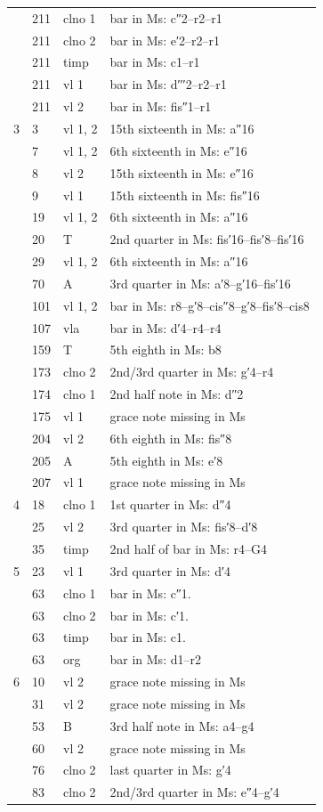 \documentclass[parskip=full]{scrreprt}
\begin{document}
\begin{longtable}{lll L{10cm}}
	  & 211 & clno 1  & bar in Ms: c″2–r2–r1 \\
	  & 211 & clno 2  & bar in Ms: e′2–r2–r1 \\
	  & 211 & timp    & bar in Ms: c1–r1 \\
	  & 211 & vl 1    & bar in Ms: d′′′2–r2–r1 \\
	  & 211 & vl 2    & bar in Ms: fis″1–r1 \\
	3 & 3   & vl 1, 2 & 15th sixteenth in Ms: a″16 \\
	  & 7   & vl 1, 2 & 6th sixteenth in Ms: e″16 \\
	  & 8   & vl 2    & 15th sixteenth in Ms: e″16 \\
	  & 9   & vl 1    & 15th sixteenth in Ms: fis″16 \\
	  & 19  & vl 1, 2 & 6th sixteenth in Ms: a″16 \\
	  & 20  & T       & 2nd quarter in Ms: fis′16–fis′8–fis′16 \\
	  & 29  & vl 1, 2 & 6th sixteenth in Ms: a″16 \\
	  & 70  & A       & 3rd quarter in Ms: a′8–g′16–fis′16 \\
	  & 101 & vl 1, 2 & bar in Ms: r8–g′8–cis″8–g′8–fis′8–cis8 \\
	  & 107 & vla     & bar in Ms: d′4–r4–r4 \\
	  & 159 & T       & 5th eighth in Ms: b8 \\
	  & 173 & clno 2  & 2nd/3rd quarter in Ms: g′4–r4 \\
	  & 174 & clno 1  & 2nd half note in Ms: d″2 \\
	  & 175 & vl 1    & grace note missing in Ms \\
	  & 204 & vl 2    & 6th eighth in Ms: fis″8 \\
	  & 205 & A       & 5th eighth in Ms: e′8 \\
	  & 207 & vl 1    & grace note missing in Ms \\
	4 & 18  & clno 1  & 1st quarter in Ms: d″4 \\
	  & 25  & vl 2    & 3rd quarter in Ms: fis′8–d′8 \\
	  & 35  & timp    & 2nd half of bar in Ms: r4–G4 \\
	5 & 23  & vl 1    & 3rd quarter in Ms: d′4 \\
	  & 63  & clno 1  & bar in Ms: c″1. \\
	  & 63  & clno 2  & bar in Ms: c′1. \\
	  & 63  & timp    & bar in Ms: c1. \\
	  & 63  & org     & bar in Ms: d1–r2 \\
	6 & 10  & vl 2    & grace note missing in Ms \\
	  & 31  & vl 2    & grace note missing in Ms \\
	  & 53  & B       & 3rd half note in Ms: a4–g4 \\
	  & 60  & vl 2    & grace note missing in Ms \\
	  & 76  & clno 2  & last quarter in Ms: g′4 \\
	  & 83  & clno 2  & 2nd/3rd quarter in Ms: e″4–g′4 \\
	\bottomrule
\end{longtable}
\end{document}
